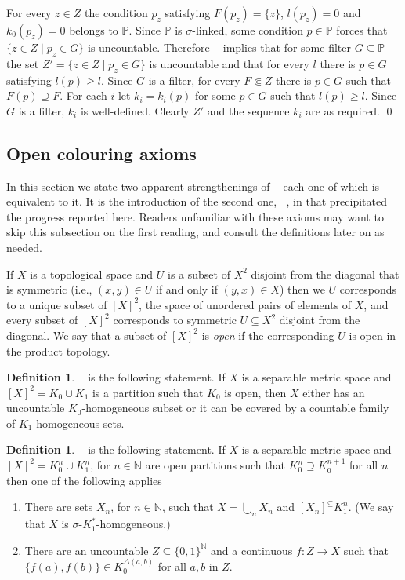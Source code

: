 \documentclass{amsart}
\makeatletter
\def\N{\mathbb N}                        %
\def\text{\mbox}
\theoremstyle{definition}
\newtheorem{definition}[proposition]{Definition}
\theoremstyle{remark}
\def\twoo{\{0,1\}^{\N}}
\renewcommand{\proofname}{Proof}
\renewenvironment{proof}[1][\proofname]{\par
\let\oldqedsymbol\qedsymbol             %
  \normalfont
  \topsep6\p@\@plus6\p@ \trivlist
  \item[\hskip\labelsep\hskip\parindent\scshape
    #1\@addpunct{.}]\ignorespaces
}{%
  \qed\endtrivlist
\global\let\qedsymbol\oldqedsymbol      %
}
\newcommand{\bbN}{\mathbb N}
\DeclareMathOperator{\OCAT}{OCA_T}
\DeclareMathOperator{\OCAinfty}{OCA_\infty}
\DeclareMathOperator{\OCAsharp}{OCA^\#}
\newcommand{\bbP}{\mathbb P}
\DeclareMathOperator{\MAsigma}{MA(\sigma-\text{linked})}
\numberwithin{claim}{subsection}
\makeatother
\begin{document}
\begin{proof}
		For every $z\in Z$ the condition $p_z$ satisfying $F(p_z)=\{z\}$, $l(p_z)=0$ and $k_0(p_z)=0$ belongs to $\bbP$. 
		Since $\bbP$ is $\sigma$-linked, some condition $p\in \bbP$ forces that $\{z\in Z\mid p_z\in G\}$ is uncountable. 
	Therefore $\MAsigma$ implies that for some filter $G\subseteq \bbP$ the set $Z'=\{z\in Z\mid p_z\in G\}$ is uncountable and that for every $l$ there is $p\in G$ satisfying $l(p)\geq l$.  Since $G$ is a filter, for every $F\Subset Z$ there is $p\in G$ such that $F(p)\supseteq F$. For each $i$ let $k_i=k_i(p)$ for some $p\in G$ such that $l(p)\geq l$. Since $G$ is a filter, $k_i$ is well-defined. Clearly $Z'$ and the sequence $k_i$ are as required. 
\end{proof}


\subsection{Open colouring axioms}\label{S.OCAsharp}

In this section we state two apparent strengthenings of $\OCAT$ each one of which is equivalent to it.  It is the introduction of the second one, $\OCAsharp$, in \cite{de2023trivial} that precipitated the progress reported here.  Readers unfamiliar with these axioms may want to skip this subsection on the first reading, and consult the definitions later on as needed. 

If $X$ is a topological space and $U$ is a subset of $X^2$ disjoint from the diagonal that is symmetric (i.e., $(x,y)\in U$ if and only if $(y,x)\in X$) then we $U$ corresponds to a unique subset of $[X]^2$, the space of unordered pairs of elements of $X$, and every subset of $[X]^2$ corresponds to symmetric $U\subseteq X^2$ disjoint from the diagonal.  We say that a subset of $[X]^2$ is \emph{open} if the corresponding $U$ is open in the product topology. 


\begin{definition} 
	$\OCAT$ is the following statement. 
	If $X$ is a separable metric space  and $[X]^2=K_0\cup K_1$ is a partition such that $K_0$ is open, then $X$ either has  an uncountable $K_0$-homogeneous subset
	or it  can be covered by a countable family of $K_1$-homogeneous sets. 
\end{definition}



\begin{definition}\label{Def.OCAinfty} 
	$\OCAinfty$ is the following statement. 
	If $X$ is a separable metric space  and $[X]^2=K_0^n\cup K_1^n$, for $n\in \bbN$  are open
	partitions such that $K_0^n\supseteq K_0^{n+1}$ for all $n$ then one of the following applies
	\begin{enumerate}
		\item There are sets $X_n$, for $n\in \bbN$, such that $X=\bigcup_n X_n$ and $[X_n]^\subseteq K_1^n$. (We say that $X$ is $\sigma$-$K_1^*$-homogeneous.)
		\item There are an uncountable $Z\subseteq \twoo$ and a continuous $f\colon Z\to X$  such that $\{f(a),f(b)\}\in K_0^{\Delta(a,b)}$ for all $a,b$ in $Z$. 
	\end{enumerate}
\end{definition}
\end{document}
